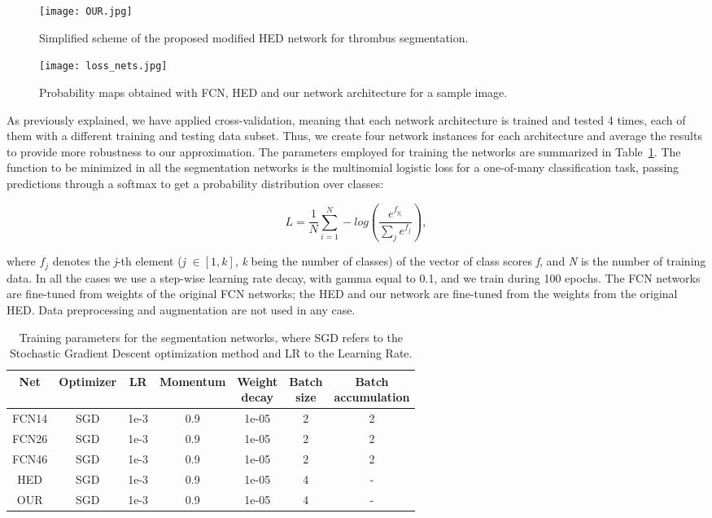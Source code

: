 \documentclass[preprint,authoryear,12pt]{elsarticle}
\begin{document}
\begin{figure}[htb]
\centering
\texttt{[image: OUR.jpg]}
\caption{\label{fig:hed_modif}Simplified scheme of the proposed modified HED network for thrombus segmentation.}
\end{figure}

\begin{figure}[htb]
\centering
\texttt{[image: loss\_nets.jpg]}
\caption{\label{fig:loss}Probability maps obtained with FCN, HED and our network architecture for a sample image.}
\end{figure}

As previously explained, we have applied cross-validation, meaning that each network architecture is trained and tested 4 times, each of them with a different training and testing data subset. Thus, we create four network instances for each architecture and average the results to provide more robustness to our approximation. The parameters employed for training the networks are summarized in Table~\ref{tab:trainingParams}. The function to be minimized in all the segmentation networks is the multinomial logistic loss for a one-of-many classification task, passing predictions through a softmax to get a probability distribution over classes: 

\[L = \frac{1}{N} \sum_{i=1}^{N}-log(\frac{e^{f_{y_{i}}}}{\sum_{j}e^{f_j}}),\]

where \(f_j\) denotes the \textit{j}-th element (\textit{j} $\in [1,k]$, \textit{k} being the number of classes) of the vector of class scores \textit{f}, and \textit{N} is the number of training data.
In all the cases we use a step-wise learning rate decay, with gamma equal to 0.1, and we train during 100 epochs. The FCN networks are fine-tuned from weights of the original FCN networks; the HED and our network are fine-tuned from the weights from the original HED. Data preprocessing and augmentation are not used in any case.

\begin{table}[htb]
\centering
\begin{tabular}{c|c|c|c|c|c|c}
\hline
Net & Optimizer & LR & Momentum & \thead{Weight \\ decay }& \thead{Batch \\ size} & \thead{Batch \\ accumulation} \\
\hline
FCN14 & SGD &  1e-3 & 0.9 & 1e-05 & 2 & 2\\
FCN26 & SGD & 1e-3 & 0.9 & 1e-05 & 2 & 2\\
FCN46 & SGD & 1e-3 & 0.9 & 1e-05 & 2 & 2\\
HED & SGD & 1e-3 & 0.9 & 1e-05 & 4 & -\\
OUR & SGD & 1e-3 & 0.9 & 1e-05 & 4 & -
\end{tabular}
\caption{\label{tab:trainingParams}Training parameters for the segmentation networks, where SGD refers to the Stochastic Gradient Descent optimization method and LR to the Learning Rate.}
\end{table}
\end{document}
